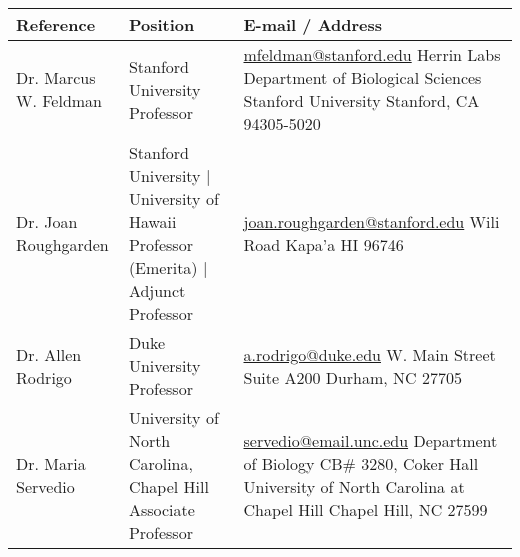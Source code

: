 \documentclass[11pt]{article}
\begin{document}
\thispagestyle{firstpage}

\vspace{2em}
\begin{center}
\begin{tabular}{lp{2.5in}p{}}
Reference & Position & E-mail / Address \\
\midrule
Dr. Marcus W. Feldman & Stanford University \newline Professor & 
\href{mailto:mfeldman@stanford.edu}{mfeldman@stanford.edu} \newline
428 Herrin Labs \newline
Department of Biological Sciences \newline
Stanford University \newline
Stanford, CA 94305-5020\\[5ex]
Dr. Joan Roughgarden & Stanford University | University of Hawaii \newline Professor (Emerita) | Adjunct Professor & 
\href{mailto:joan.roughgarden@stanford.edu}{joan.roughgarden@stanford.edu} \newline
5241 Wili Road\newline
Kapa'a HI 96746\\[5ex]
Dr. Allen Rodrigo & Duke University \newline Professor & 
\href{mailto:a.rodrigo@duke.edu}{a.rodrigo@duke.edu} \newline
2024 W. Main Street \newline
Suite A200 \newline
Durham, NC 27705 \\[5ex]
Dr. Maria Servedio & University of North Carolina, Chapel Hill \newline Associate Professor & 
\href{mailto:servedio@email.unc.edu}{servedio@email.unc.edu} \newline
Department of Biology \newline
CB\# 3280, Coker Hall \newline
University of North Carolina at Chapel Hill \newline
Chapel Hill, NC 27599 \\
\bottomrule
\end{tabular}
\end{center}
\end{document}
